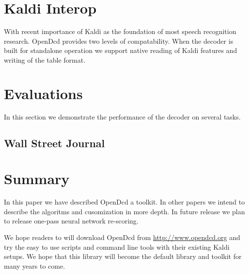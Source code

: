 \documentclass{article}
\begin{document}
\section{Kaldi Interop}
With recent importance of Kaldi as the foundation of most speech recognition
research. OpenDcd provides two levels of compatability.
When the decoder is built for standalone operation we support native reading
of Kaldi features and writing of the table format.


\section{Evaluations}
\label{sec:majhead}
In this section we demonstrate the performance of the decoder on several 
tasks.

\subsection{Wall Street Journal}

\section{Summary}
\label{sec:page}
In this paper we have described OpenDcd a toolkit. In other papers we intend to
describe the algoritms and cusomization in more depth. In future release we
plan to release one-pass neural network re-scoring.

We hope readers to will download OpenDcd from  \url{http://www.opendcd.org} and
try the easy to use scripts and command line tools with their existing Kaldi setups.
We hope that this library will become the default library and toolkit for many 
years to come.



\end{document}
